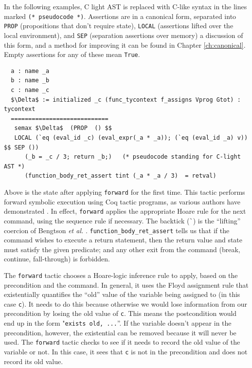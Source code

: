 \documentclass{puthesis}
\begin{document}
In the following examples, C light AST is replaced with C-like syntax
in the lines marked \lstinline|(* pseudocode *)|. Assertions are in a
canonical form, separated into \lstinline|PROP| (propositions that
don't require state), \lstinline|LOCAL| (assertions lifted over the
local environment), and \lstinline|SEP| (separation assertions over
memory) a discussion of this form, and a method for improving it can
be found in Chapter \ref{ch:canonical}. Empty assertions for any of
these mean \lstinline|True|.

\begin{lstlisting}
  a : name _a
  b : name _b
  c : name _c
  $\Delta$ := initialized _c (func_tycontext f_assigns Vprog Gtot) : tycontext
  ============================
   semax $\Delta$  (PROP  () $$ 
   LOCAL (`eq (eval_id _c) (eval_expr(_a * _a)); (`eq (eval_id _a) v)) $$ SEP ()) 
      (_b = _c / 3; return _b;)   (* pseudocode standing for C-light AST *) 
      (function_body_ret_assert tint (_a * _a / 3)  = retval)
\end{lstlisting}

Above is the state after applying \lstinline|forward| for the first
time.  This tactic performs forward symbolic execution using Coq
tactic programs, as various authors have demonstrated
\cite{appel06:listmachine,chlipala11:pldi,bengtson12:Charge,mccreight09}. In
effect, \lstinline|forward| applies the appropriate Hoare rule for the
next command, using the sequence rule if necessary. The backtick
(\lstinline|`|) is the ``lifting'' coercion of Bengtson \emph{et al.}
\cite{bengtson12:Charge}.  \lstinline|function_body_ret_assert| tells
us that if the command wishes to execute a return statement, then the
return value and state must satisfy the given predicate; and any other
exit from the command (break, continue, fall-through) is forbidden.

The \lstinline|forward| tactic chooses a Hoare-logic inference rule to
apply, based on the precondition and the command. In general, it uses
the Floyd assignment rule that existentially quantifies the ``old''
value of the variable being assigned to (in this case
\lstinline|c|). It needs to do this because otherwise we would lose
information from our precondition by losing the old value of
\lstinline|c|. This means the postcondition would end up in the form
"\lstinline|exists old, ...|''. If the variable doesn't appear in the
precondition, however, the existential can be removed because it will
never be used. The \lstinline|forward| tactic checks to see if it
needs to record the old value of the variable or not. In this case, it
sees that \lstinline|c| is not in the precondition and does not record
its old value.
\end{document}
